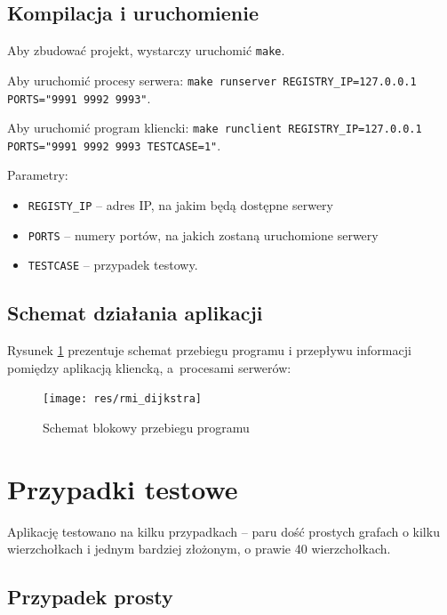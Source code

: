\documentclass{article}
\begin{document}
\subsection{Kompilacja i uruchomienie}

Aby zbudować projekt, wystarczy uruchomić \texttt{make}. 

Aby uruchomić procesy serwera: \texttt{make runserver REGISTRY\_IP=127.0.0.1 PORTS="9991 9992 9993"}. 

Aby uruchomić program kliencki: \texttt{make runclient REGISTRY\_IP=127.0.0.1 PORTS="9991 9992 9993 TESTCASE=1"}. 

Parametry:
\begin{itemize} 
	\item \texttt{REGISTY\_IP} -- adres IP, na jakim będą dostępne serwery
	\item \texttt{PORTS} -- numery portów, na jakich zostaną uruchomione serwery
	\item \texttt{TESTCASE} -- przypadek testowy.
\end{itemize}

\clearpage

\subsection{Schemat działania aplikacji}

Rysunek \ref{flowchart} prezentuje schemat przebiegu programu i przepływu informacji pomiędzy aplikacją kliencką, a~procesami serwerów:

\begin{figure}[!h]
	\centering
	\texttt{[image: res/rmi\_dijkstra]}
	\caption{Schemat blokowy przebiegu programu}
	\label{flowchart}
\end{figure}


\clearpage

\section{Przypadki testowe}

Aplikację testowano na kilku przypadkach -- paru dość prostych grafach o kilku wierzchołkach i jednym bardziej złożonym, o prawie 40 wierzchołkach.

\subsection{Przypadek prosty}
\end{document}
